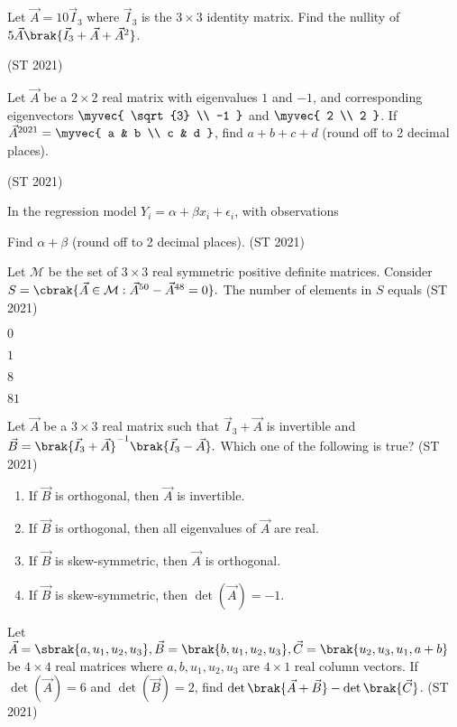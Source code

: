\item
Let $\vec{A} = 10\vec{I}_3$ where $\vec{I}_3$ is the $3 \times 3$ identity matrix.  
Find the nullity of
$
5\vec{A} \brak{\vec{I}_3 + \vec{A} + \vec{A}^2}
$.

\hfill (ST 2021) 
\item
Let $\vec{A}$ be a $2 \times 2$ real matrix with eigenvalues $1$ and $-1$, and corresponding eigenvectors
$
\myvec{ \sqrt{3} \\ -1 }$
and
$\myvec{ 2 \\ 2 }
$.
If $\vec{A}^{2021} = \myvec{ a & b \\ c & d }$,  
find $a+b+c+d$ (round off to 2 decimal places).

\hfill (ST 2021) 
\item
In the regression model $Y_i = \alpha + \beta x_i + \epsilon_i$,  
with observations 

\bigskip

 

\bigskip

Find $\alpha + \beta$ (round off to 2 decimal places).
\hfill (ST 2021) 
\item
Let $\mathcal{M}$ be the set of $3\times 3$ real symmetric positive definite matrices. Consider  
$
S = \cbrak{ \vec{A} \in \mathcal{M} : \vec{A}^{50} - \vec{A}^{48} = 0 }.
$
The number of elements in $S$ equals
\hfill (ST 2021) 
\begin{enumerate}
	\begin{multicols}{4}
\item $0$
\item $1$
\item $8$
\item $81$
\end{multicols}
\end{enumerate}
\item
Let $\vec{A}$ be a $3\times 3$ real matrix such that $\vec{I}_3 + \vec{A}$ is invertible and
$
\vec{B} = \brak{\vec{I}_3 + \vec{A}}^{-1}\brak{\vec{I}_3 - \vec{A}}.
$
Which one of the following is true?
\hfill (ST 2021) 
\begin{enumerate}
\item If $\vec{B}$ is orthogonal, then $\vec{A}$ is invertible.
\item If $\vec{B}$ is orthogonal, then all eigenvalues of $\vec{A}$ are real.
\item If $\vec{B}$ is skew-symmetric, then $\vec{A}$ is orthogonal.
\item If $\vec{B}$ is skew-symmetric, then $\det(\vec{A}) = -1$.
\end{enumerate}
\item
Let 
$
\vec{A} = \sbrak{a, u_1, u_2, u_3}, 
\vec{B} = \brak{b, u_1, u_2, u_3}, 
\vec{C} = \brak{u_2, u_3, u_1, a+b}
$
be $4\times 4$ real matrices where $a,b,u_1,u_2,u_3$ are $4 \times 1$ real column vectors.  
If $\det(\vec{A}) = 6$ and $\det(\vec{B}) = 2$, find $\det\brak{\vec{A}+\vec{B}} - \det\brak{\vec{C}}$.
\hfill (ST 2021) 
